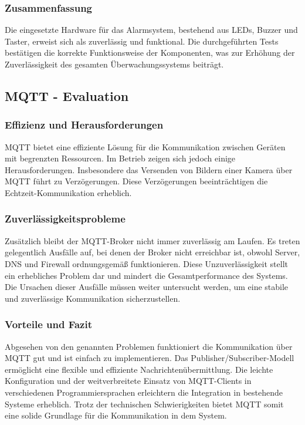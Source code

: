 \subsubsection{Zusammenfassung}
Die eingesetzte Hardware für das Alarmsystem, bestehend aus LEDs, Buzzer und Taster, erweist sich als zuverlässig und funktional. Die durchgeführten Tests bestätigen die korrekte Funktionsweise der Komponenten, was zur Erhöhung der Zuverlässigkeit des gesamten Überwachungssystems beiträgt.

\subsection{MQTT - Evaluation}

\subsubsection{Effizienz und Herausforderungen}
MQTT bietet eine effiziente Lösung für die Kommunikation zwischen Geräten mit begrenzten Ressourcen. Im Betrieb zeigen sich jedoch einige Herausforderungen. Insbesondere das Versenden von Bildern einer Kamera über MQTT führt zu Verzögerungen. Diese Verzögerungen beeinträchtigen die Echtzeit-Kommunikation erheblich.

\subsubsection{Zuverlässigkeitsprobleme}
Zusätzlich bleibt der MQTT-Broker nicht immer zuverlässig am Laufen. Es treten gelegentlich Ausfälle auf, bei denen der Broker nicht erreichbar ist, obwohl Server, DNS und Firewall ordnungsgemäß funktionieren. Diese Unzuverlässigkeit stellt ein erhebliches Problem dar und mindert die Gesamtperformance des Systems. Die Ursachen dieser Ausfälle müssen weiter untersucht werden, um eine stabile und zuverlässige Kommunikation sicherzustellen.

\subsubsection{Vorteile und Fazit}
Abgesehen von den genannten Problemen funktioniert die Kommunikation über MQTT gut und ist einfach zu implementieren. Das Publisher/Subscriber-Modell ermöglicht eine flexible und effiziente Nachrichtenübermittlung. Die leichte Konfiguration und der weitverbreitete Einsatz von MQTT-Clients in verschiedenen Programmiersprachen erleichtern die Integration in bestehende Systeme erheblich. Trotz der technischen Schwierigkeiten bietet MQTT somit eine solide Grundlage für die Kommunikation in dem System.


